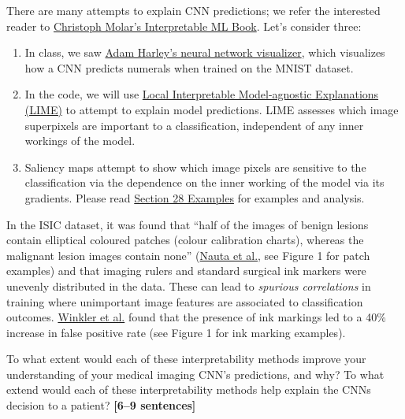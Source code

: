\documentclass{csci1430}
\begin{document}
\pagebreak 
There are many attempts to explain CNN predictions; we refer the interested reader to \href{https://christophm.github.io/interpretable-ml-book/}{Christoph Molar's Interpretable ML Book}. Let's consider three:
\begin{enumerate}
    \item In class, we saw \href{https://adamharley.com/nn_vis/cnn/2d.html}{Adam Harley's neural network visualizer}, which visualizes how a CNN predicts numerals when trained on the MNIST dataset.
    
    \item In the code, we will use \href{https://christophm.github.io/interpretable-ml-book/lime.html#fig-lime-images-package-example-include}{Local Interpretable Model-agnostic Explanations (LIME)} to attempt to explain model predictions. LIME assesses which image superpixels are important to a classification, independent of any inner workings of the model.

    \item Saliency maps attempt to show which image pixels are sensitive to the classification via the dependence on the inner working of the model via its gradients. 
    Please read \href{https://christophm.github.io/interpretable-ml-book/pixel-attribution.html#fig-classifications}{Section 28 Examples} for examples and analysis. 
\end{enumerate}

In the ISIC dataset, it was found that ``half of the images of benign lesions contain elliptical coloured patches (colour calibration charts), whereas the malignant lesion images contain none'' (\href{https://www.mdpi.com/2075-4418/12/1/40}{Nauta et al.}, see Figure 1 for patch examples) and that imaging rulers and standard surgical ink markers were unevenly distributed in the data. These can lead to \emph{spurious correlations} in training where unimportant image features are associated to classification outcomes. \href{https://www.ncbi.nlm.nih.gov/pmc/articles/PMC6694463/}{Winkler et al.} found that the presence of ink markings led to a 40\% increase in false positive rate (see Figure 1 for ink marking examples).


\begin{subquestion}[points=6]
To what extent would each of these interpretability methods improve your understanding of your medical imaging CNN's predictions, and why?
To what extend would each of these interpretability methods help explain the CNNs decision to a patient?
\textbf{[6--9 sentences]}
\end{subquestion}
\end{document}
